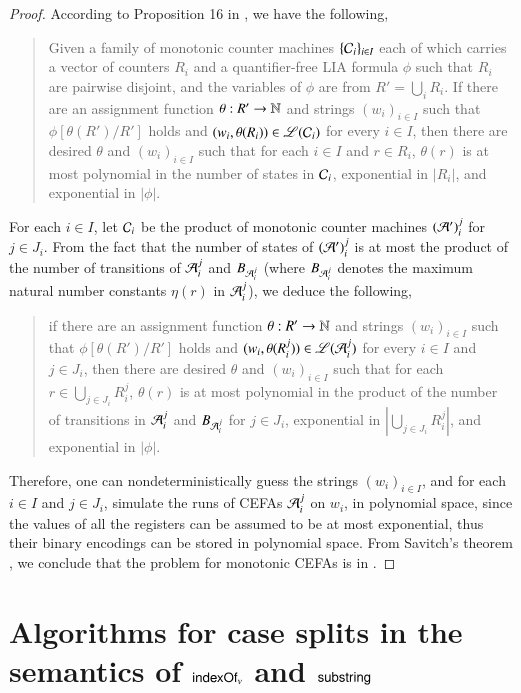 \begin{proof}
According to Proposition 16 in \cite{LB16}, we have the following, 
\begin{quote}
Given a family of monotonic counter machines $\{ \mathcal{C}_i \}_{i\in I}$ each of which carries a vector of counters $R_i$ and a quantifier-free LIA formula $\phi$ such that $ R_i$ are pairwise disjoint,  and the variables of $\phi$ are from $R'=\bigcup_{i} R_i$. If there are an assignment function $\theta: R' \rightarrow \mathbb{N}$ and strings $(w_i)_{i \in I}$ such that  $\phi[\theta(R' )/R']$ holds and $(w_i, \theta(R_i)) \in \mathscr{L}(\mathcal{C}_{i})$ for every $i \in I$, then there are desired $\theta$ and $(w_i)_{i \in I}$ such that for each $i \in I$ and $r \in R_i$, $\theta(r)$ is at most polynomial in the number of states in $\mathcal{C}_i $, exponential in $|R_i|$, and exponential in $|\phi|$.
\end{quote}
For each $i \in I$, let $\mathcal{C}_i$ be the product of monotonic counter machines $(\mathcal{A}')_i^j$ for $j \in J_i$. 
From the fact that the number of states of $(\mathcal{A}')_i^j$ is at most the product of the number of transitions of $\mathcal{A}_i^j$ and $B_{\mathcal{A}_i^j}$ (where $B_{\mathcal{A}_i^j}$ denotes the maximum natural number constants $\eta(r)$ in $\mathcal{A}_i^j$), we deduce the following,
\begin{quote}
if there are an assignment function $\theta: R' \rightarrow \mathbb{N}$ and strings $(w_i)_{i \in I}$ such that  $\phi[\theta(R' )/R']$ holds and $(w_i, \theta(R_i^j)) \in \mathscr{L}(\mathcal{A}_i^j)$ for every $i \in I$ and $j \in J_i$, then there are desired $\theta$ and $(w_i)_{i \in I}$ such that for each $r \in \bigcup_{j \in J_i} R^j_i$, $\theta(r)$ is at most polynomial in the product of the number of transitions in $\mathcal{A}_i^j$ and $B_{\mathcal{A}_i^j}$ for $j \in J_i$, exponential in $\left|\bigcup_{j \in J_i} R^j_i \right|$, and exponential in $|\phi|$.
\end{quote}

Therefore, one can nondeterministically guess the strings $(w_i)_{i \in I}$, and for each $i \in I$ and $j \in J_i$, simulate the runs of CEFAs $\mathcal{A}_i^j$ on $w_i$, in polynomial space, since  the values of all the registers can be assumed to be at most exponential, thus their binary encodings can be stored in polynomial space. From Savitch's theorem \cite{complexity-book}, we conclude that the {\lasat} problem for monotonic CEFAs is in {\pspace}.
\end{proof}






\section{Algorithms for case splits in the semantics of $\mathsf{indexOf}_v$ and $\mathsf{substring}$}\label{app:case-split-semantics}

